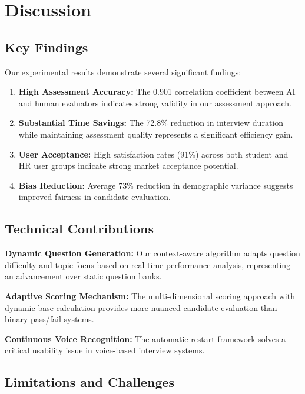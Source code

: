 \documentclass[conference]{IEEEtran}
\begin{document}
\section{Discussion}

\subsection{Key Findings}

Our experimental results demonstrate several significant findings:

\begin{enumerate}
\item \textbf{High Assessment Accuracy:} The 0.901 correlation coefficient between AI and human evaluators indicates strong validity in our assessment approach.
\item \textbf{Substantial Time Savings:} The 72.8\% reduction in interview duration while maintaining assessment quality represents a significant efficiency gain.
\item \textbf{User Acceptance:} High satisfaction rates (91\%) across both student and HR user groups indicate strong market acceptance potential.
\item \textbf{Bias Reduction:} Average 73\% reduction in demographic variance suggests improved fairness in candidate evaluation.
\end{enumerate}

\subsection{Technical Contributions}

\textbf{Dynamic Question Generation:} Our context-aware algorithm adapts question difficulty and topic focus based on real-time performance analysis, representing an advancement over static question banks.

\textbf{Adaptive Scoring Mechanism:} The multi-dimensional scoring approach with dynamic base calculation provides more nuanced candidate evaluation than binary pass/fail systems.

\textbf{Continuous Voice Recognition:} The automatic restart framework solves a critical usability issue in voice-based interview systems.

\subsection{Limitations and Challenges}
\end{document}
